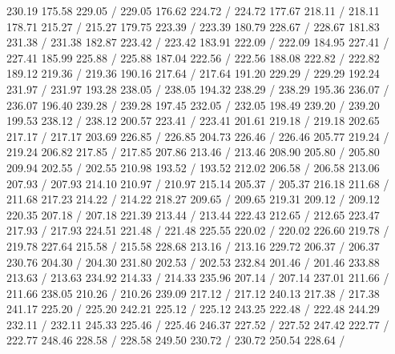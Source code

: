 { 230.19 175.58 229.05 /
 229.05 176.62 224.72 /
 224.72 177.67 218.11 /
 218.11 178.71 215.27 /
 215.27 179.75 223.39 /
 223.39 180.79 228.67 /
 228.67 181.83 231.38 /
 231.38 182.87 223.42 /
 223.42 183.91 222.09 /
 222.09 184.95 227.41 /
 227.41 185.99 225.88 /
 225.88 187.04 222.56 /
 222.56 188.08 222.82 /
 222.82 189.12 219.36 /
 219.36 190.16 217.64 /
 217.64 191.20 229.29 /
 229.29 192.24 231.97 /
 231.97 193.28 238.05 /
 238.05 194.32 238.29 /
 238.29 195.36 236.07 /
 236.07 196.40 239.28 /
 239.28 197.45 232.05 /
 232.05 198.49 239.20 /
 239.20 199.53 238.12 /
 238.12 200.57 223.41 /
 223.41 201.61 219.18 /
 219.18 202.65 217.17 /
 217.17 203.69 226.85 /
 226.85 204.73 226.46 /
 226.46 205.77 219.24 /
 219.24 206.82 217.85 /
 217.85 207.86 213.46 /
 213.46 208.90 205.80 /
 205.80 209.94 202.55 /
 202.55 210.98 193.52 /
 193.52 212.02 206.58 /
 206.58 213.06 207.93 /
 207.93 214.10 210.97 /
 210.97 215.14 205.37 /
 205.37 216.18 211.68 /
 211.68 217.23 214.22 /
 214.22 218.27 209.65 /
 209.65 219.31 209.12 /
 209.12 220.35 207.18 /
 207.18 221.39 213.44 /
 213.44 222.43 212.65 /
 212.65 223.47 217.93 /
 217.93 224.51 221.48 /
 221.48 225.55 220.02 /
 220.02 226.60 219.78 /
 219.78 227.64 215.58 /
 215.58 228.68 213.16 /
 213.16 229.72 206.37 /
 206.37 230.76 204.30 /
 204.30 231.80 202.53 /
 202.53 232.84 201.46 /
 201.46 233.88 213.63 /
 213.63 234.92 214.33 /
 214.33 235.96 207.14 /
 207.14 237.01 211.66 /
 211.66 238.05 210.26 /
 210.26 239.09 217.12 /
 217.12 240.13 217.38 /
 217.38 241.17 225.20 /
 225.20 242.21 225.12 /
 225.12 243.25 222.48 /
 222.48 244.29 232.11 /
 232.11 245.33 225.46 /
 225.46 246.37 227.52 /
 227.52 247.42 222.77 /
 222.77 248.46 228.58 /
 228.58 249.50 230.72 /
 230.72 250.54 228.64 /
}
